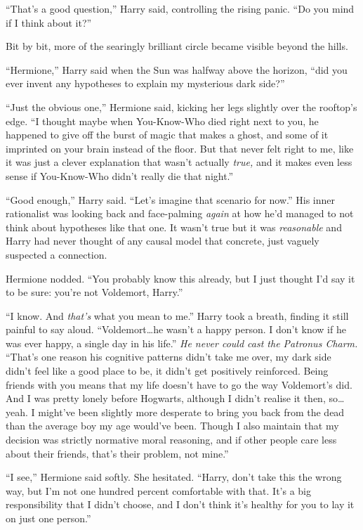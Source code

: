 “That’s a good question,” Harry said, controlling the rising panic. “Do you mind if I think about it?”

Bit by bit, more of the searingly brilliant circle became visible beyond the hills.

“Hermione,” Harry said when the Sun was halfway above the horizon, “did you ever invent any hypotheses to explain my mysterious dark side?”

“Just the obvious one,” Hermione said, kicking her legs slightly over the rooftop’s edge. “I thought maybe when You-Know-Who died right next to you, he happened to give off the burst of magic that makes a ghost, and some of it imprinted on your brain instead of the floor. But that never felt right to me, like it was just a clever explanation that wasn’t actually \emph{true,} and it makes even less sense if You-Know-Who didn’t really die that night.”

“Good enough,” Harry said. “Let’s imagine that scenario for now.” His inner rationalist was looking back and face-palming \emph{again} at how he’d managed to not think about hypotheses like that one. It wasn’t true but it was \emph{reasonable} and Harry had never thought of any causal model that concrete, just vaguely suspected a connection.

Hermione nodded. “You probably know this already, but I just thought I’d say it to be sure: you’re not Voldemort, Harry.”

“I know. And \emph{that’s} what you mean to me.” Harry took a breath, finding it still painful to say aloud. “Voldemort…he wasn’t a happy person. I don’t know if he was ever happy, a single day in his life.” \emph{He never could cast the Patronus Charm.} “That’s one reason his cognitive patterns didn’t take me over, my dark side didn’t feel like a good place to be, it didn’t get positively reinforced. Being friends with you means that my life doesn’t have to go the way Voldemort’s did. And I was pretty lonely before Hogwarts, although I didn’t realise it then, so…yeah. I might’ve been slightly more desperate to bring you back from the dead than the average boy my age would’ve been. Though I also maintain that my decision was strictly normative moral reasoning, and if other people care less about their friends, that’s their problem, not mine.”

“I see,” Hermione said softly. She hesitated. “Harry, don’t take this the wrong way, but I’m not one hundred percent comfortable with that. It’s a big responsibility that I didn’t choose, and I don’t think it’s healthy for you to lay it on just one person.”

